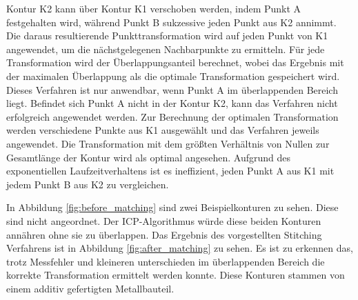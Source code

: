 Kontur K2 kann über Kontur K1 verschoben werden, indem Punkt A festgehalten wird, 
während Punkt B sukzessive jeden Punkt aus K2 annimmt. 
Die daraus resultierende Punkttransformation wird auf jeden Punkt von K1 angewendet, 
um die nächstgelegenen Nachbarpunkte zu ermitteln. Für jede Transformation wird der 
Überlappungsanteil berechnet, wobei das Ergebnis mit der maximalen Überlappung
als die optimale Transformation gespeichert wird.
Dieses Verfahren ist nur anwendbar, wenn Punkt A im überlappenden Bereich liegt. 
Befindet sich Punkt A nicht in der Kontur K2, 
kann das Verfahren nicht erfolgreich angewendet werden.
Zur Berechnung der optimalen Transformation werden verschiedene Punkte aus K1 
ausgewählt und das Verfahren jeweils angewendet. 
Die Transformation mit dem größten Verhältnis von Nullen zur
Gesamtlänge der Kontur wird als optimal angesehen. 
Aufgrund des exponentiellen Laufzeitverhaltens ist es ineffizient, 
jeden Punkt A aus K1 mit jedem Punkt B aus K2 zu vergleichen.

In Abbildung \ref{fig:before_matching} sind zwei Beispielkonturen zu sehen. 
Diese sind nicht angeordnet. Der ICP-Algorithmus würde diese beiden Konturen 
annähren ohne sie zu überlappen. 
Das Ergebnis des vorgestellten Stitching Verfahrens ist in Abbildung 
\ref{fig:after_matching} zu sehen. Es ist zu erkennen das, trotz Messfehler und 
kleineren unterschieden im überlappenden Bereich die korrekte Transformation 
ermittelt werden konnte. Diese Konturen stammen von einem additiv gefertigten 
Metallbauteil.

